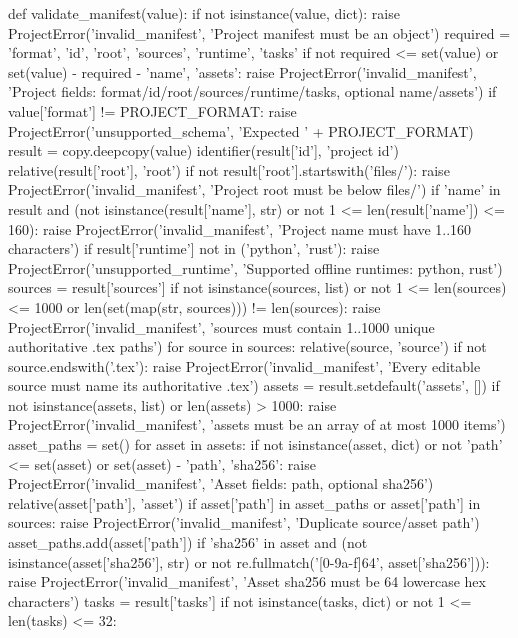 def validate_manifest(value):
    if not isinstance(value, dict):
        raise ProjectError('invalid_manifest', 'Project manifest must be an object')
    required = {'format', 'id', 'root', 'sources', 'runtime', 'tasks'}
    if not required <= set(value) or set(value) - required - {'name', 'assets'}:
        raise ProjectError('invalid_manifest', 'Project fields: format/id/root/sources/runtime/tasks, optional name/assets')
    if value['format'] != PROJECT_FORMAT:
        raise ProjectError('unsupported_schema', 'Expected ' + PROJECT_FORMAT)
    result = copy.deepcopy(value)
    identifier(result['id'], 'project id')
    relative(result['root'], 'root')
    if not result['root'].startswith('files/'):
        raise ProjectError('invalid_manifest', 'Project root must be below files/')
    if 'name' in result and (not isinstance(result['name'], str) or not 1 <= len(result['name']) <= 160):
        raise ProjectError('invalid_manifest', 'Project name must have 1..160 characters')
    if result['runtime'] not in ('python', 'rust'):
        raise ProjectError('unsupported_runtime', 'Supported offline runtimes: python, rust')
    sources = result['sources']
    if not isinstance(sources, list) or not 1 <= len(sources) <= 1000 or len(set(map(str, sources))) != len(sources):
        raise ProjectError('invalid_manifest', 'sources must contain 1..1000 unique authoritative .tex paths')
    for source in sources:
        relative(source, 'source')
        if not source.endswith('.tex'):
            raise ProjectError('invalid_manifest', 'Every editable source must name its authoritative .tex')
    assets = result.setdefault('assets', [])
    if not isinstance(assets, list) or len(assets) > 1000:
        raise ProjectError('invalid_manifest', 'assets must be an array of at most 1000 items')
    asset_paths = set()
    for asset in assets:
        if not isinstance(asset, dict) or not {'path'} <= set(asset) or set(asset) - {'path', 'sha256'}:
            raise ProjectError('invalid_manifest', 'Asset fields: path, optional sha256')
        relative(asset['path'], 'asset')
        if asset['path'] in asset_paths or asset['path'] in sources:
            raise ProjectError('invalid_manifest', 'Duplicate source/asset path')
        asset_paths.add(asset['path'])
        if 'sha256' in asset and (not isinstance(asset['sha256'], str) or not re.fullmatch('[0-9a-f]{64}', asset['sha256'])):
            raise ProjectError('invalid_manifest', 'Asset sha256 must be 64 lowercase hex characters')
    tasks = result['tasks']
    if not isinstance(tasks, dict) or not 1 <= len(tasks) <= 32:
